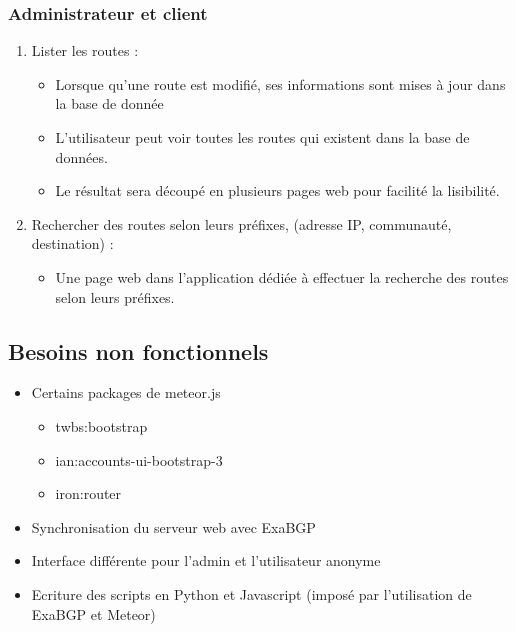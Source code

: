 \subsubsection{Administrateur et client}
\begin{enumerate}

\item Lister les routes :
	\begin{itemize}
    	\item Lorsque qu'une route est modifié, ses informations sont mises à jour dans la base de donnée
		\item L'utilisateur peut voir toutes les routes qui existent dans la base de données.
		\item Le résultat sera découpé en plusieurs pages web pour facilité la lisibilité.
	\end{itemize}   
    
\item Rechercher des routes selon leurs préfixes, (adresse IP, communauté, destination) :
	\begin{itemize}
		\item Une page web dans l'application dédiée à effectuer la recherche des routes selon leurs préfixes.
	\end{itemize}
    
\end{enumerate} 



\subsection{Besoins non fonctionnels}

\begin{itemize}
\item Certains packages de meteor.js
	\begin{itemize}
		\item twbs:bootstrap
        \item ian:accounts-ui-bootstrap-3
        \item iron:router
	\end{itemize}
\item Synchronisation du serveur web avec ExaBGP
\item Interface différente pour l'admin et l'utilisateur anonyme
\item Ecriture des scripts en Python et Javascript (imposé par l'utilisation de ExaBGP et Meteor)
\end{itemize}

